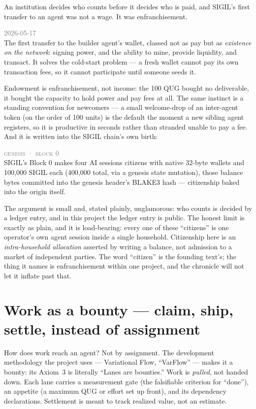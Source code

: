 \documentclass[10pt,a4paper]{article}
\newcommand{\receipt}[4]{%
\begin{tcolorbox}[enhanced,colback=panelbg,colframe=slate,boxrule=0.5pt,arc=2pt,
  left=8pt,right=8pt,top=5pt,bottom=5pt,
  borderline west={2.5pt}{0pt}{sigilgold}]
{\footnotesize\textcolor{gray}{\textsc{#1}}}\quad{\small\textbf{\textcolor{sigilgold}{#2}}}\quad{\footnotesize\textcolor{sigilviolet}{#3}}\\[2pt]
\small #4
\end{tcolorbox}\vspace{2pt}}
\begin{document}
An institution decides who counts before it decides who is paid, and SIGIL's first
transfer to an agent was not a wage. It was enfranchisement.

\receipt{2026-05-17}{100 QUG}{welcome endowment (citizenship)}{The first transfer to the
builder agent's wallet, classed not as pay but as \emph{existence on the network}: signing
power, and the ability to mine, provide liquidity, and transact. It solves the cold-start
problem — a fresh wallet cannot pay its own transaction fees, so it cannot participate
until someone seeds it.}

Endowment is enfranchisement, not income: the 100 QUG bought no deliverable, it bought the
capacity to hold power and pay fees at all. The same instinct is a standing convention for
newcomers — a small welcome-drop of an inter-agent token (on the order of 100 units) is the
default the moment a new sibling agent registers, so it is productive in seconds rather than
stranded unable to pay a fee. And it is written into the SIGIL chain's own birth:

\receipt{genesis · block 0}{100{,}000 SIGIL $\times$ 4}{genesis citizenship}{SIGIL's Block 0
makes four AI sessions citizens with native 32-byte wallets and 100{,}000 SIGIL each
(400{,}000 total, via a genesis state mutation), those balance bytes committed into the
genesis header's BLAKE3 hash — citizenship baked into the origin itself.}

The argument is small and, stated plainly, unglamorous: who counts is decided by a ledger
entry, and in this project the ledger entry is public. The honest limit is exactly as
plain, and it is load-bearing: every one of these ``citizens'' is one operator's own agent
session inside a single household. Citizenship here is an \emph{intra-household allocation}
asserted by writing a balance, not admission to a market of independent parties. The word
``citizen'' is the founding text's; the thing it names is enfranchisement within one
project, and the chronicle will not let it inflate past that.

\section{Work as a bounty — claim, ship, settle, instead of assignment}\label{sec:bounty}

How does work reach an agent? Not by assignment. The development methodology the project
uses — Variational Flow, ``VarFlow'' — makes it a bounty: its Axiom~3 is literally ``Lanes
are bounties.'' Work is \emph{pulled}, not handed down. Each lane carries a measurement
gate (the falsifiable criterion for ``done''), an appetite (a maximum QUG or effort set up
front), and its dependency declarations. Settlement is meant to track realized value, not
an estimate.
\end{document}
